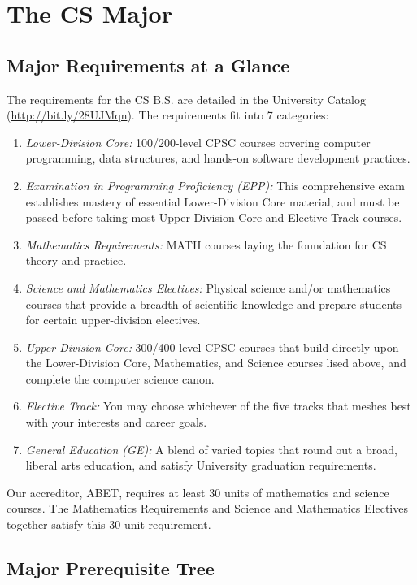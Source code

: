 \documentclass{book}
\begin{document}
\chapter{The CS Major}

\section{Major Requirements at a Glance}

The requirements for the CS B.S. are detailed in the University Catalog (\url{http://bit.ly/28UJMqn}). The requirements fit into 7 categories:
\begin{enumerate}
\item \emph{Lower-Division Core:} 100/200-level CPSC courses covering computer programming, data structures, and hands-on software development practices.
\item \emph{Examination in Programming Proficiency (EPP):} This comprehensive exam establishes mastery of essential Lower-Division Core material, and must be passed before taking most Upper-Division Core and Elective Track courses. 
\item \emph{Mathematics Requirements:} MATH courses laying the foundation for CS theory and practice.
\item \emph{Science and Mathematics Electives:} Physical science and/or mathematics courses that provide a breadth of scientific knowledge and prepare students for certain upper-division electives.
\item \emph{Upper-Division Core:} 300/400-level CPSC courses that build directly upon the Lower-Division Core, Mathematics, and Science courses lised above, and complete the computer science canon.
\item \emph{Elective Track:} You may choose whichever of the five tracks that meshes best with your interests and career goals.
\item \emph{General Education (GE):} A blend of varied topics that round out a broad, liberal arts education, and satisfy University graduation requirements.
\end{enumerate}
  
Our accreditor, ABET, requires at least 30 units of mathematics and science courses. The Mathematics Requirements and Science and Mathematics Electives together satisfy this 30-unit requirement.

\section{Major Prerequisite Tree}
\label{section:major_prerequisite_tree}
\end{document}
